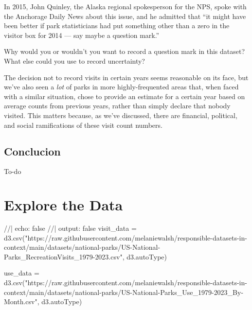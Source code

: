 \documentclass[
  letterpaper,
  DIV=11,
  numbers=noendperiod]{scrartcl}
\newenvironment{Shaded}{\begin{snugshade}}{\end{snugshade}}
\newcommand{\NormalTok}[1]{\textcolor[rgb]{0.00,0.23,0.31}{#1}}
\begin{document}
In 2015, John Quinley, the Alaska regional spokesperson for the NPS,
spoke with the Anchorage Daily News about this issue, and he admitted
that ``it might have been better if park statisticians had put something
other than a zero in the visitor box for 2014 --- say maybe a question
mark.''

\begin{tcolorbox}[enhanced jigsaw, colbacktitle=quarto-callout-tip-color!10!white, bottomrule=.15mm, breakable, leftrule=.75mm, titlerule=0mm, opacitybacktitle=0.6, arc=.35mm, toprule=.15mm, coltitle=black, colframe=quarto-callout-tip-color-frame, bottomtitle=1mm, toptitle=1mm, left=2mm, title=\textcolor{quarto-callout-tip-color}{\faLightbulb}\hspace{0.5em}{Discussion}, colback=white, rightrule=.15mm, opacityback=0]

Why would you or wouldn't you want to record a question mark in this
dataset? What else could you use to record uncertainty?

\end{tcolorbox}

The decision not to record visits in certain years seems reasonable on
its face, but we've also seen a \emph{lot} of parks in more
highly-frequented areas that, when faced with a similar situation, chose
to provide an estimate for a certain year based on average counts from
previous years, rather than simply declare that nobody visited. This
matters because, as we've discussed, there are financial, political, and
social ramifications of these visit count numbers.

\subsection{Conclucion}\label{conclucion}

To-do

\section{Explore the Data}

\begin{Shaded}
\begin{Highlighting}[]
\NormalTok{//| echo: false}
\NormalTok{//| output: false}
\NormalTok{visit\_data = d3.csv("https://raw.githubusercontent.com/melaniewalsh/responsible{-}datasets{-}in{-}context/main/datasets/national{-}parks/US{-}National{-}Parks\_RecreationVisits\_1979{-}2023.csv", d3.autoType)}

\NormalTok{use\_data = d3.csv("https://raw.githubusercontent.com/melaniewalsh/responsible{-}datasets{-}in{-}context/main/datasets/national{-}parks/US{-}National{-}Parks\_Use\_1979{-}2023\_By{-}Month.csv", d3.autoType)}
\end{Highlighting}
\end{Shaded}
\end{document}
